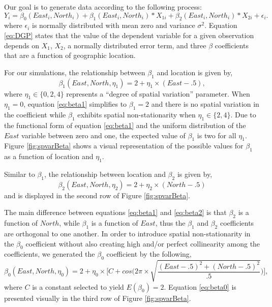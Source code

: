 \documentclass{article}\usepackage[]{graphicx}\usepackage[]{color}
\begin{document}
Our goal is to generate data according to the following process:
\begin{equation} \label{eq:DGP}
Y_i = \beta _0 (East_i, North_i) + \beta _1 (East_i, North_i)*X_{1i} + \beta _2 (East_i, North_i) * X_{2i} + \epsilon _i.
\end{equation}
where $\epsilon _i$ is normally distributed with mean zero and variance $\sigma ^2$. Equation \ref{eq:DGP} states that the value of the dependent variable for a given observation depends on $X_1$, $X_2$, a normally distributed error term, and three $\beta$ coefficients that are a function of geographic location.

For our simulations, the relationship between $\beta _1$ and location is given by,
\begin{equation}\label{eq:beta1}
\beta _1(East,North,\eta _1) =  2 + \eta _1 \times (East - .5) ,
\end{equation}
where $\eta _1 \in \{0, 2, 4\}$ represents a ``degree of spatial variation'' parameter. When $\eta _1 =0$, equation \eqref{eq:beta1} simplifies to $\beta _1 =2$ and there is no spatial variation in the coefficient while $\beta _1$ exhibits spatial non-stationarity when $\eta _1 \in \{2, 4\}$. Due to the functional form of equation \eqref{eq:beta1} and the uniform distribution of the $East$ variable between zero and one, the expected value of $\beta _1$ is two for all $\eta _1$. Figure \ref{fig:spvarBeta} shows a visual representation of the possible values for $\beta _1$ as a function of location and $\eta _1$. 

Similar to $\beta _1$, the relationship between location and $\beta _2$ is given by,
\begin{equation}\label{eq:beta2}
\beta _2(East,North,\eta _2) =  2 + \eta _2 \times (North- .5)
\end{equation}
and is displayed in the second row of Figure \ref{fig:spvarBeta}. 

The main difference between equations \eqref{eq:beta1} and \eqref{eq:beta2} is that $\beta _2$ is a function of $North$, while $\beta _1$ is a function of $East$, thus the $\beta _1$ and $\beta _2$ coefficients are orthogonal to one another. In order to introduce spatial non-stationarity in the $\beta _0$ coefficient without also creating high and/or perfect collinearity among the coefficients, we generated the $\beta _0$ coefficient by the following,
\begin{equation}\label{eq:beta0}
\beta _0(East,North,\eta _0) = 2 + \eta _0 \times \Bigg[C + cos\Bigg(2\pi\times\sqrt{\frac{(East - .5)^2 + (North- .5)^2}{.5}}\Bigg)\Bigg],
\end{equation}
where $C$ is a constant selected to yield $E(\beta _0) = 2$. Equation \eqref{eq:beta0} is presented visually in the third row of Figure \ref{fig:spvarBeta}.
\end{document}
